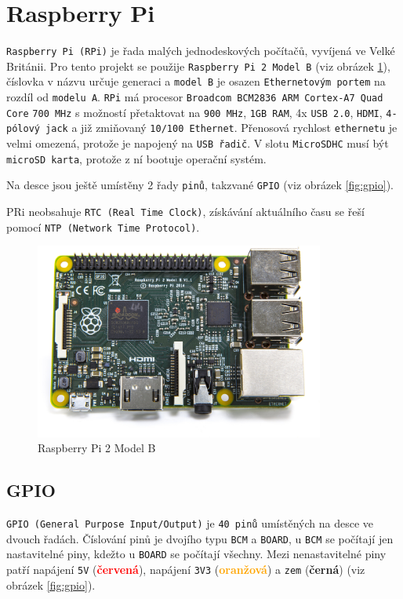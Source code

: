 \documentclass[czech,BP]{thesiskiv}
\begin{document}
	\section{Raspberry Pi}
		\texttt{Raspberry Pi (RPi)} je řada malých jednodeskových počítačů, vyvíjená ve Velké Británii. Pro tento projekt se použije \texttt{Raspberry Pi 2 Model B} (viz obrázek \ref{fig:rpi2}), číslovka v názvu určuje generaci a \texttt{model B} je osazen \texttt{Ethernetovým portem} na rozdíl od \texttt{modelu A}. \texttt{RPi} má procesor \texttt{Broadcom BCM2836 ARM Cortex-A7 Quad Core} \texttt{700 MHz} s možností přetaktovat na \texttt{900 MHz}, \texttt{1GB RAM}, 4x \texttt{USB 2.0}, \texttt{HDMI}, \texttt{4-pólový jack} a již zmiňovaný \texttt{10/100 Ethernet}. Přenosová rychlost \texttt{ethernetu} je velmi omezená, protože je napojený na \texttt{USB řadič}. V slotu \texttt{MicroSDHC} musí být \texttt{microSD karta}, protože z ní bootuje operační systém. 
		
Na desce jsou ještě umístěny 2 řady \texttt{pinů}, takzvané \texttt{GPIO} (viz obrázek \ref{fig:gpio}).

PRi neobsahuje \texttt{RTC (Real Time Clock)}, získávání aktuálního času se řeší pomocí \texttt{NTP (Network Time Protocol)}.
	
	
		\begin{figure}[H]
		\centering
		\includegraphics[width=0.85\textwidth]{../images/rpi2.jpg}	
		\caption{Raspberry Pi 2 Model B}
		\label{fig:rpi2}
	\end{figure}
		
	

		\subsection{GPIO}
			\texttt{GPIO (General Purpose Input/Output)} je \texttt{40 pinů} umístěných na desce ve dvouch řadách. Číslování pinů je dvojího typu \texttt{BCM} a \texttt{BOARD}, u \texttt{BCM} se počítají jen nastavitelné piny, kdežto u \texttt{BOARD} se počítají všechny.
Mezi nenastavitelné piny patří napájení \texttt{5V} (\textcolor{red}{\textbf{červená}}), napájení \texttt{3V3} (\textcolor{orange}{\textbf{oranžová}}) a \texttt{zem} (\textbf{černá}) (viz obrázek \ref{fig:gpio}).	
		
\end{document}
